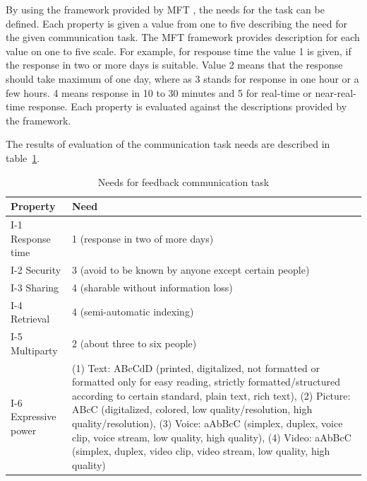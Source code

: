 \documentclass[english,12pt,a4paper,pdftex]{article}
\begin{document}
By using the framework provided by \ac{MFT} \citep{higa2007}, the needs for the task can be defined. Each property is given a value from one to five describing the need for the given communication task. The \ac{MFT} framework provides description for each value on one to five scale. For example, for response time the value 1 is given, if the response in two or more days is suitable. Value 2 means that the response should take maximum of one day, where as 3 stands for response in one hour or a few hours. 4 means response in 10 to 30 minutes and 5 for real-time or near-real-time response. Each property is evaluated against the descriptions provided by the framework. 

The results of evaluation of the communication task needs are described in table~\ref{table:needs_for_feedback_communication_task}.

\begin{table}[!h]
\renewcommand{\arraystretch}{1.3}
\caption{Needs for feedback communication task}
\label{table:needs_for_feedback_communication_task}
\centering
\begin{tabular}{|p{7cm}|p{7cm}|}
\hline
\textbf{Property} & \textbf{Need}\\
\hline
I-1 Response time & 1 (response in two of more days) \\
\hline
I-2 Security & 3 (avoid to be known by anyone except certain people) \\
\hline
I-3 Sharing & 4 (sharable without information loss) \\
\hline
I-4 Retrieval & 4 (semi-automatic indexing) \\
\hline
I-5 Multiparty & 2 (about three to six people) \\
\hline
I-6 Expressive power & (1) Text: ABcCdD (printed, digitalized, not formatted or formatted only for easy reading, strictly formatted/structured according to certain standard, plain text, rich text), (2) Picture: ABcC (digitalized, colored, low quality/resolution, high quality/resolution), (3) Voice: aAbBcC (simplex, duplex, voice clip, voice stream, low quality, high quality), (4) Video: aAbBcC (simplex, duplex, video clip, video stream, low quality, high quality) \\
\hline
\end{tabular}
\end{table}
\end{document}
